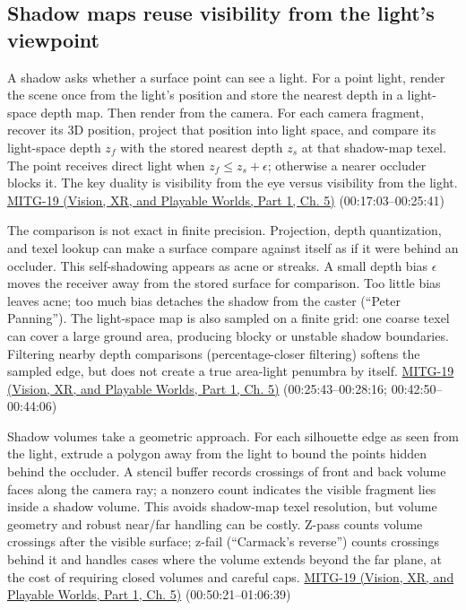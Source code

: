 \subsection{Shadow maps reuse visibility from the light's viewpoint}\label{04-visual-computing-ii-ch028-shadow-maps-reuse-visibility-from-the-lights-viewpoint}

\hypertarget{04-visual-computing-ii-ch028-shadow-maps-reuse-visibility-from-the-lights-viewpoint}{}

A shadow asks whether a surface point can see a light. For a point light, render the scene once from the light's position and store the nearest depth in a light-space depth map. Then render from the camera. For each camera fragment, recover its 3D position, project that position into light space, and compare its light-space depth \(z_f\) with the stored nearest depth \(z_s\) at that shadow-map texel. The point receives direct light when \(z_f\le z_s+\epsilon\); otherwise a nearer occluder blocks it. The key duality is visibility from the eye versus visibility from the light. \href{../07-Vision-XR-and-Playable-Worlds-P01/main.pdf\#nameddest=04-visual-computing-ii-ch036-mitg-19---shadow-maps}{MITG-19 (Vision, XR, and Playable Worlds, Part 1, Ch. 5)} (00:17:03--00:25:41)

The comparison is not exact in finite precision. Projection, depth quantization, and texel lookup can make a surface compare against itself as if it were behind an occluder. This self-shadowing appears as acne or streaks. A small depth bias \(\epsilon\) moves the receiver away from the stored surface for comparison. Too little bias leaves acne; too much bias detaches the shadow from the caster (``Peter Panning''). The light-space map is also sampled on a finite grid: one coarse texel can cover a large ground area, producing blocky or unstable shadow boundaries. Filtering nearby depth comparisons (percentage-closer filtering) softens the sampled edge, but does not create a true area-light penumbra by itself. \href{../07-Vision-XR-and-Playable-Worlds-P01/main.pdf\#nameddest=04-visual-computing-ii-ch036-mitg-19---shadow-maps}{MITG-19 (Vision, XR, and Playable Worlds, Part 1, Ch. 5)} (00:25:43--00:28:16; 00:42:50--00:44:06)

Shadow volumes take a geometric approach. For each silhouette edge as seen from the light, extrude a polygon away from the light to bound the points hidden behind the occluder. A stencil buffer records crossings of front and back volume faces along the camera ray; a nonzero count indicates the visible fragment lies inside a shadow volume. This avoids shadow-map texel resolution, but volume geometry and robust near/far handling can be costly. Z-pass counts volume crossings after the visible surface; z-fail (``Carmack's reverse'') counts crossings behind it and handles cases where the volume extends beyond the far plane, at the cost of requiring closed volumes and careful caps. \href{../07-Vision-XR-and-Playable-Worlds-P01/main.pdf\#nameddest=04-visual-computing-ii-ch036-mitg-19---shadow-maps}{MITG-19 (Vision, XR, and Playable Worlds, Part 1, Ch. 5)} (00:50:21--01:06:39)

